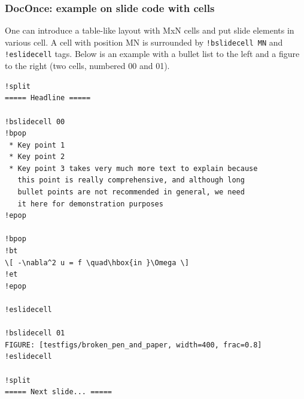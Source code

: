 \documentclass{beamer}
\begin{document}
\begin{frame}
\frametitle{DocOnce: example on slide code with cells}

One can introduce a table-like layout with MxN cells and
put slide elements in various cell. A cell with position
MN is surrounded by \Verb?!bslidecell MN? and \Verb?!eslidecell?
tags. Below is an example with a bullet list to the left and
a figure to the right (two cells, numbered 00 and 01).
\begin{Verbatim}[numbers=none,fontsize=\fontsize{9pt}{9pt},baselinestretch=0.95]
!split
===== Headline =====

!bslidecell 00
!bpop
 * Key point 1
 * Key point 2
 * Key point 3 takes very much more text to explain because
   this point is really comprehensive, and although long
   bullet points are not recommended in general, we need
   it here for demonstration purposes
!epop

!bpop
!bt
\[ -\nabla^2 u = f \quad\hbox{in }\Omega \]
!et
!epop

!eslidecell

!bslidecell 01
FIGURE: [testfigs/broken_pen_and_paper, width=400, frac=0.8]
!eslidecell

!split
===== Next slide... =====

\end{Verbatim}
\end{frame}
\end{document}
